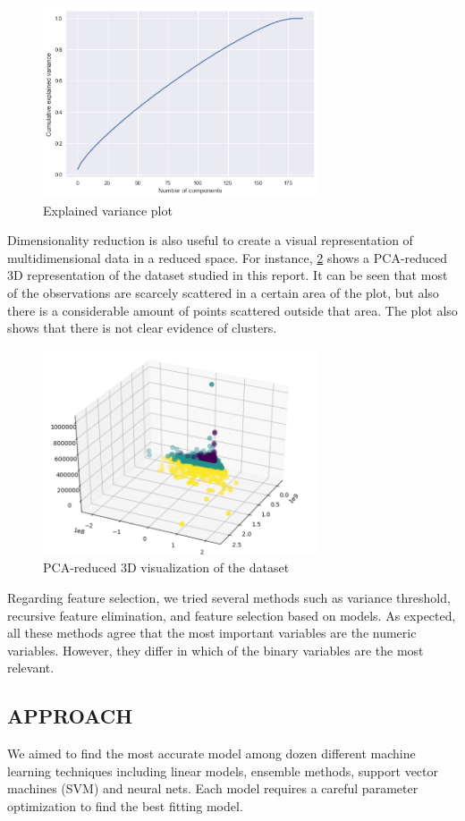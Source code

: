 \begin{figure}[h]
\centering
\includegraphics[width=3.2in]{figures/variance}
\caption{Explained variance plot} 
\label{fig:variance}
\end{figure}

Dimensionality reduction is also useful to create a visual representation of multidimensional data in a reduced space. For instance, \figurename{} \ref{fig:pca} shows a PCA-reduced 3D representation of the dataset studied in this report. It can be seen that most of the observations are scarcely scattered in a certain area of the plot, but also there is a considerable amount of points scattered outside that area. The plot also shows that there is not clear evidence of clusters. 

\begin{figure}[h]
\centering
\includegraphics[width=3.2in]{figures/pca}
\caption{PCA-reduced 3D visualization of the dataset} 
\label{fig:pca}
\end{figure}

Regarding feature selection, we tried several methods such as variance threshold, recursive feature elimination, and feature selection based on models. As expected, all these methods agree that the most important variables are the numeric variables. However, they differ in which of the binary variables are the most relevant.

\subsection{APPROACH}
We aimed to find the most accurate model among dozen different machine learning techniques including linear models, ensemble methods, support vector machines (SVM) and neural nets.  Each model requires a careful parameter optimization to find the best fitting model. 
 
